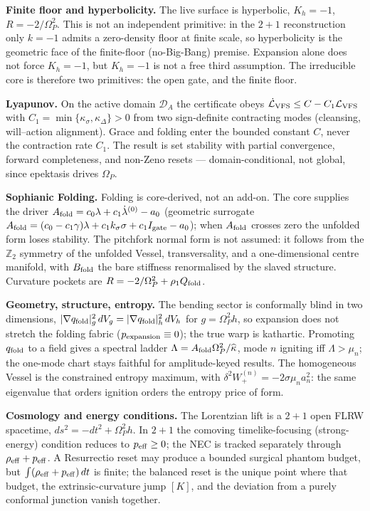 \documentclass[11pt,a4paper,oneside]{book}
\newcommand{\Op}{\Omega_P}
\theoremstyle{plain}
\theoremstyle{definition}
\theoremstyle{remark}
\begin{document}
\textbf{Finite floor and hyperbolicity.} The live surface is hyperbolic, $K_h=-1$, $R=-2/\Op^2$. This is
not an independent primitive: in the $2{+}1$ reconstruction only $k=-1$ admits a zero-density floor at
finite scale, so hyperbolicity is the geometric face of the finite-floor (no-Big-Bang) premise.
Expansion alone does not force $K_h=-1$, but $K_h=-1$ is not a free third assumption. The irreducible
core is therefore two primitives: the open gate, and the finite floor.

\textbf{Lyapunov.} On the active domain $\mathcal D_A$ the certificate obeys
$\dot{\mathcal L}_{\rm VFS}\le C-C_1\mathcal L_{\rm VFS}$ with $C_1=\min\{\kappa_\sigma,\kappa_\Delta\}>0$
from two sign-definite contracting modes (cleansing, will--action alignment). Grace and folding enter the
bounded constant $C$, never the contraction rate $C_1$. The result is set stability with partial
convergence, forward completeness, and non-Zeno resets --- domain-conditional, not global, since
epektasis drives $\Op$.

\textbf{Sophianic Folding.} Folding is core-derived, not an add-on. The core supplies the driver
$A_{\rm fold}=c_0\lambda+c_1\dot\lambda^{(0)}-a_0$ (geometric surrogate
$A_{\rm fold}=(c_0-c_1\gamma)\lambda+c_1k_\sigma\sigma+c_1I_{\rm gate}-a_0$); when $A_{\rm fold}$ crosses
zero the unfolded form loses stability. The pitchfork normal form is not assumed: it follows from the
$\mathbb Z_2$ symmetry of the unfolded Vessel, transversality, and a one-dimensional centre manifold, with
$B_{\rm fold}$ the bare stiffness renormalised by the slaved structure. Curvature pockets are
$R=-2/\Op^2+\rho_1 Q_{\rm fold}$.

\textbf{Geometry, structure, entropy.} The bending sector is conformally blind in two dimensions,
$|\nabla q_{\rm fold}|_g^2\,dV_g=|\nabla q_{\rm fold}|_h^2\,dV_h$ for $g=\Op^2h$, so expansion does not
stretch the folding fabric ($p_{\rm expansion}\equiv0$); the true warp is kathartic. Promoting
$q_{\rm fold}$ to a field gives a spectral ladder $\Lambda=A_{\rm fold}\Op^2/\widehat\kappa$, mode $n$
igniting iff $\Lambda>\mu_n$; the one-mode chart stays faithful for amplitude-keyed results. The
homogeneous Vessel is the constrained entropy maximum, with $\delta^2 W_+^{(n)}=-2\sigma\mu_n a_n^2$: the
same eigenvalue that orders ignition orders the entropy price of form.

\textbf{Cosmology and energy conditions.} The Lorentzian lift is a $2{+}1$ open FLRW spacetime,
$ds^2=-dt^2+\Op^2 h$. In $2{+}1$ the comoving timelike-focusing (strong-energy) condition reduces to
$p_{\rm eff}\ge0$; the NEC is tracked separately through $\rho_{\rm eff}+p_{\rm eff}$. A Resurrectio reset
may produce a bounded surgical phantom budget, but $\int(\rho_{\rm eff}+p_{\rm eff})\,dt$ is finite; the
balanced reset is the unique point where that budget, the extrinsic-curvature jump $[K]$, and the
deviation from a purely conformal junction vanish together.
\end{document}
